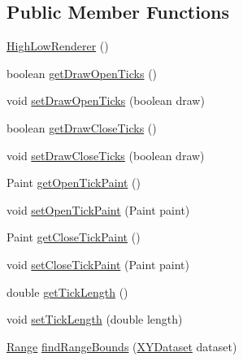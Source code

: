 \subsection*{Public Member Functions}
\begin{DoxyCompactItemize}
\item 
\mbox{\hyperlink{classorg_1_1jfree_1_1chart_1_1renderer_1_1xy_1_1_high_low_renderer_aa9b55449ee5dedf1b0a0741b0645f2b7}{High\+Low\+Renderer}} ()
\item 
boolean \mbox{\hyperlink{classorg_1_1jfree_1_1chart_1_1renderer_1_1xy_1_1_high_low_renderer_af57b0bfb305076aeb2522047392adb44}{get\+Draw\+Open\+Ticks}} ()
\item 
void \mbox{\hyperlink{classorg_1_1jfree_1_1chart_1_1renderer_1_1xy_1_1_high_low_renderer_aadd13238450e724e2fe9d8143fe105bc}{set\+Draw\+Open\+Ticks}} (boolean draw)
\item 
boolean \mbox{\hyperlink{classorg_1_1jfree_1_1chart_1_1renderer_1_1xy_1_1_high_low_renderer_a5e9153dd2313078005e9eb7b6f5befae}{get\+Draw\+Close\+Ticks}} ()
\item 
void \mbox{\hyperlink{classorg_1_1jfree_1_1chart_1_1renderer_1_1xy_1_1_high_low_renderer_aeb8b735bd5d7b60340adb7d575c9e51a}{set\+Draw\+Close\+Ticks}} (boolean draw)
\item 
Paint \mbox{\hyperlink{classorg_1_1jfree_1_1chart_1_1renderer_1_1xy_1_1_high_low_renderer_aa1736c9fa4a2ca796213ac10998f7539}{get\+Open\+Tick\+Paint}} ()
\item 
void \mbox{\hyperlink{classorg_1_1jfree_1_1chart_1_1renderer_1_1xy_1_1_high_low_renderer_a4655b4b71ecba1e39957fa0a578728c1}{set\+Open\+Tick\+Paint}} (Paint paint)
\item 
Paint \mbox{\hyperlink{classorg_1_1jfree_1_1chart_1_1renderer_1_1xy_1_1_high_low_renderer_a948cf128b2e7f01d815dc351cd2f3286}{get\+Close\+Tick\+Paint}} ()
\item 
void \mbox{\hyperlink{classorg_1_1jfree_1_1chart_1_1renderer_1_1xy_1_1_high_low_renderer_afda700a1415ace745064ee5f13a49c1d}{set\+Close\+Tick\+Paint}} (Paint paint)
\item 
double \mbox{\hyperlink{classorg_1_1jfree_1_1chart_1_1renderer_1_1xy_1_1_high_low_renderer_a4ffbe156619ad52c131b2b946f109234}{get\+Tick\+Length}} ()
\item 
void \mbox{\hyperlink{classorg_1_1jfree_1_1chart_1_1renderer_1_1xy_1_1_high_low_renderer_a1194fdcfc70ded6eed708d56d96b0d8b}{set\+Tick\+Length}} (double length)
\item 
\mbox{\hyperlink{classorg_1_1jfree_1_1data_1_1_range}{Range}} \mbox{\hyperlink{classorg_1_1jfree_1_1chart_1_1renderer_1_1xy_1_1_high_low_renderer_acb74a93988ad6f6eeeb87ed2610b0032}{find\+Range\+Bounds}} (\mbox{\hyperlink{interfaceorg_1_1jfree_1_1data_1_1xy_1_1_x_y_dataset}{X\+Y\+Dataset}} dataset)

\end{DoxyCompactItemize}

